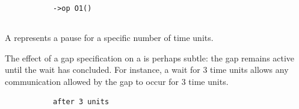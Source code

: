 \begin{figure}[H]
\begin{subfigure}[t]{\egtextwidth}
\begin{lstlisting}[style=Example]
->op O1()
\end{lstlisting}
\end{subfigure}
\hfill
\begin{subfigure}[t]{\eggraphicalwidth}
\gsecaption
\centering
{}
\end{subfigure}

\end{figure}

\subsection{\mwaitaction}\label{ssec:metamodel-actions-waits}

A \mwaitaction{} represents a pause for a specific number of time
units.

\begin{remark}
  The effect of a gap specification on a \mwaitaction{} is perhaps
  subtle: the gap remains active until the wait has concluded.  For
  instance, a wait for \(3\) time units allows any communication
  allowed by the gap to occur for \(3\) time units.
\end{remark} 

\begin{figure}[H]
\begin{subfigure}[t]{\egtextwidth}
\begin{lstlisting}[style=Example]
after 3 units
\end{lstlisting}
\end{subfigure}
\hfill
\begin{subfigure}[t]{\eggraphicalwidth}
\gsecaption
\centering
{}
\end{subfigure}

\end{figure}

